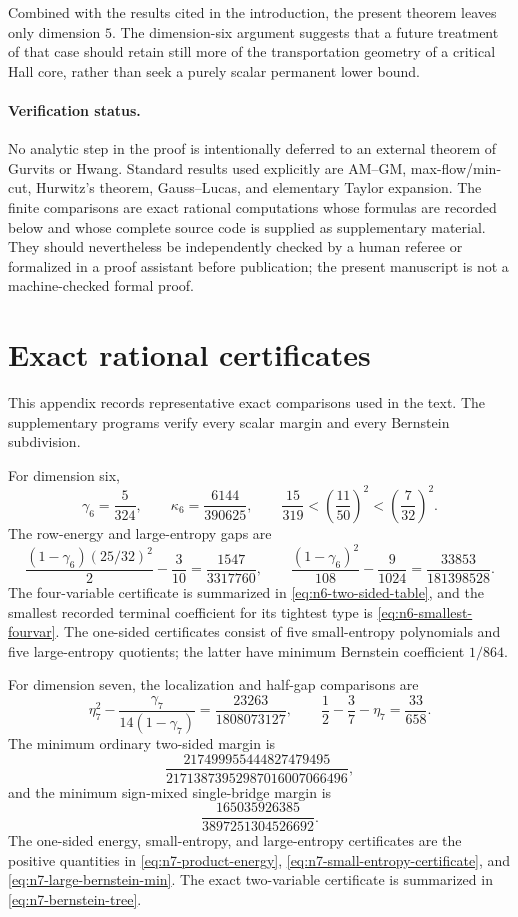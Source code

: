 \documentclass[11pt]{article}
\theoremstyle{definition}
\newcommand{\1}{\mathbf{1}}
\begin{document}
Combined with the results cited in the introduction, the present theorem
leaves only dimension $5$.  The dimension-six argument suggests that a
future treatment of that case should retain still more of the transportation
geometry of a critical Hall core, rather than seek a purely scalar permanent
lower bound.

\paragraph{Verification status.}
No analytic step in the proof is intentionally deferred to an external theorem of Gurvits or Hwang.  Standard results used explicitly are AM--GM, max-flow/min-cut, Hurwitz's theorem, Gauss--Lucas, and elementary Taylor expansion.  The finite comparisons are exact rational computations whose formulas are recorded below and whose complete source code is supplied as supplementary material.  They should nevertheless be independently checked by a human referee or formalized in a proof assistant before publication; the present manuscript is not a machine-checked formal proof.

\appendix

\section{Exact rational certificates}\label{app:certificates}

This appendix records representative exact comparisons used in the text.
The supplementary programs verify every scalar margin and every Bernstein
subdivision.

For dimension six,
\[
 \gamma_6=\frac5{324},\qquad
 \kappa_6=\frac{6144}{390625},\qquad
 \frac{15}{319}<\left(\frac{11}{50}\right)^2
 <\left(\frac7{32}\right)^2.
\]
The row-energy and large-entropy gaps are
\[
 \frac{(1-\gamma_6)(25/32)^2}{2}-\frac3{10}
 =\frac{1547}{3317760},
 \qquad
 \frac{(1-\gamma_6)^2}{108}-\frac9{1024}
 =\frac{33853}{181398528}.
\]
The four-variable certificate is summarized in
\eqref{eq:n6-two-sided-table}, and the smallest recorded terminal
coefficient for its tightest type is
\eqref{eq:n6-smallest-fourvar}.  The one-sided certificates consist of five
small-entropy polynomials and five large-entropy quotients; the latter have
minimum Bernstein coefficient $1/864$.

For dimension seven, the localization and half-gap comparisons are
\[
 \eta_7^2-\frac{\gamma_7}{14(1-\gamma_7)}
 =\frac{23263}{1808073127},
 \qquad
 \frac12-\frac37-\eta_7=\frac{33}{658}.
 \tag{A.1}\label{eq:app-n7-localization}
\]
The minimum ordinary two-sided margin is
\[
 \frac{217499955444827479495}
 {21713873952987016007066496},
\]
and the minimum sign-mixed single-bridge margin is
\[
 \frac{165035926385}{3897251304526692}.
\]
The one-sided energy, small-entropy, and large-entropy certificates are the
positive quantities in \eqref{eq:n7-product-energy},
\eqref{eq:n7-small-entropy-certificate}, and
\eqref{eq:n7-large-bernstein-min}.  The exact two-variable certificate is
summarized in \eqref{eq:n7-bernstein-tree}.
\end{document}

